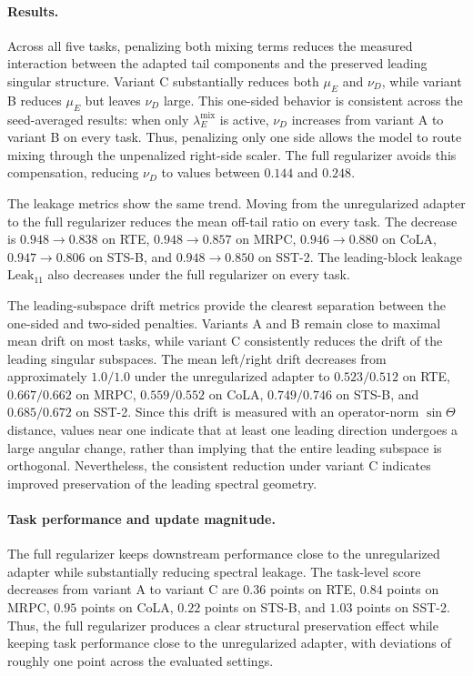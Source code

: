 \documentclass{article}
\begin{document}
\paragraph{Results.}
Across all five tasks, penalizing both mixing terms reduces the measured
interaction between the adapted tail components and the preserved leading
singular structure. Variant C substantially reduces both \(\mu_E\) and
\(\nu_D\), while variant B reduces \(\mu_E\) but leaves \(\nu_D\) large. This
one-sided behavior is consistent across the seed-averaged results: when only
\(\lambda_E^{\mathrm{mix}}\) is active, \(\nu_D\) increases from variant A to
variant B on every task. Thus, penalizing only one side allows the model to
route mixing through the unpenalized right-side scaler. The full regularizer
avoids this compensation, reducing \(\nu_D\) to values between \(0.144\) and
\(0.248\).

The leakage metrics show the same trend. Moving from the unregularized adapter
to the full regularizer reduces the mean off-tail ratio on every task. The
decrease is \(0.948 \rightarrow 0.838\) on RTE,
\(0.948 \rightarrow 0.857\) on MRPC,
\(0.946 \rightarrow 0.880\) on CoLA,
\(0.947 \rightarrow 0.806\) on STS-B, and
\(0.948 \rightarrow 0.850\) on SST-2. The leading-block leakage
\(\mathrm{Leak}_{11}\) also decreases under the full regularizer on every task.

The leading-subspace drift metrics provide the clearest separation between the
one-sided and two-sided penalties. Variants A and B remain close to maximal
mean drift on most tasks, while variant C consistently reduces the drift of the
leading singular subspaces. The mean left/right drift decreases from
approximately \(1.0/1.0\) under the unregularized adapter to \(0.523/0.512\)
on RTE, \(0.667/0.662\) on MRPC, \(0.559/0.552\) on CoLA, \(0.749/0.746\) on
STS-B, and \(0.685/0.672\) on SST-2. Since this drift is measured with an
operator-norm \(\sin\Theta\) distance, values near one indicate that at least
one leading direction undergoes a large angular change, rather than implying
that the entire leading subspace is orthogonal. Nevertheless, the consistent
reduction under variant C indicates improved preservation of the leading
spectral geometry.

\paragraph{Task performance and update magnitude.}
The full regularizer keeps downstream performance close to the unregularized
adapter while substantially reducing spectral leakage. The task-level score
decreases from variant A to variant C are \(0.36\) points on RTE, \(0.84\)
points on MRPC, \(0.95\) points on CoLA, \(0.22\) points on STS-B, and
\(1.03\) points on SST-2. Thus, the full regularizer produces a clear
structural preservation effect while keeping task performance close to the
unregularized adapter, with deviations of roughly one point across the
evaluated settings.
\end{document}
